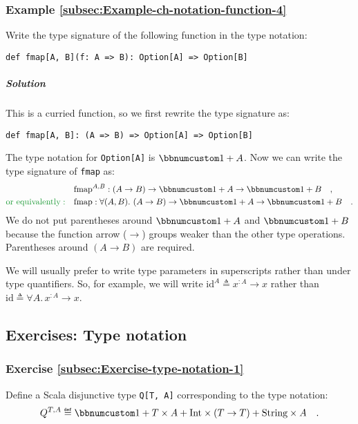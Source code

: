 \subsubsection{Example \label{subsec:Example-ch-notation-function-4}\ref{subsec:Example-ch-notation-function-4}}

Write the type signature of the following function in the type notation:
\begin{lstlisting}
def fmap[A, B](f: A => B): Option[A] => Option[B]
\end{lstlisting}


\subparagraph{Solution}

This is a curried function, so we first rewrite the type signature
as:
\begin{lstlisting}
def fmap[A, B]: (A => B) => Option[A] => Option[B]
\end{lstlisting}
The type notation for \lstinline!Option[A]! is $\bbnum 1+A$. Now
we can write the type signature of \lstinline!fmap! as:
\begin{align*}
 & \text{fmap}^{A,B}:\left(A\rightarrow B\right)\rightarrow\bbnum 1+A\rightarrow\bbnum 1+B\quad,\\
{\color{greenunder}\text{or equivalently}:}\quad & \text{fmap}:\forall(A,B).\,\left(A\rightarrow B\right)\rightarrow\bbnum 1+A\rightarrow\bbnum 1+B\quad.
\end{align*}
We do not put parentheses around $\bbnum 1+A$ and $\bbnum 1+B$ because
the function arrow ($\rightarrow$) groups weaker than the other type
operations. Parentheses around $\left(A\rightarrow B\right)$ are
required.

We will usually prefer to write type parameters in superscripts rather
than under type quantifiers. So, for example, we will write $\text{id}^{A}\triangleq x^{:A}\rightarrow x$
rather than $\text{id}\triangleq\forall A.\,x^{:A}\rightarrow x$.

\subsection{Exercises: Type notation}

\subsubsection{Exercise \label{subsec:Exercise-type-notation-1}\ref{subsec:Exercise-type-notation-1}}

Define a Scala disjunctive type \lstinline!Q[T, A]! corresponding
to the type notation:
\[
Q^{T,A}\triangleq\bbnum 1+T\times A+\text{Int}\times(T\rightarrow T)+\text{String}\times A\quad.
\]



